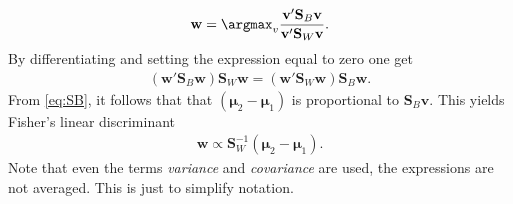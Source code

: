 \begin{align}
  \mathbf{w} = \argmax_v  \frac{\mathbf{v}'\mathbf{S}_B \mathbf{v}}{\mathbf{v}' \mathbf{S}_W \mathbf{v}}.
\end{align}
By differentiating and setting the expression equal to zero one get
\begin{align}
  (\mathbf{w}' \mathbf{S}_B \mathbf{w})\mathbf{S}_W \mathbf{w} = (\mathbf{w}' \mathbf{S}_W \mathbf{w})\mathbf{S}_B \mathbf{w}.
\end{align}
From \eqref{eq:SB}, it follows that that $(\bm{\mu}_2 - \bm{\mu}_1)$ is proportional to $\mathbf{S}_B \mathbf{v}$. This yields Fisher's linear discriminant
\begin{align}
  \mathbf{w} \propto \mathbf{S}_W^{-1} (\bm \mu_2 - \bm \mu_1).
\end{align}
Note that even the terms \textit{variance} and \textit{covariance} are used, the expressions are not averaged. This is just to simplify notation. \\
\\
